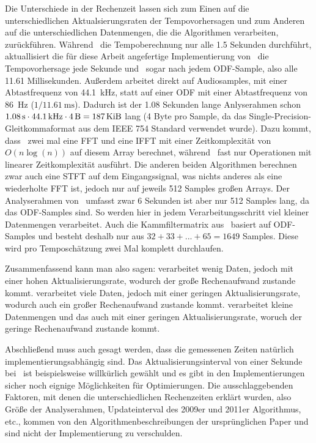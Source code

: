 {{		%
		Die Unterschiede in der Rechenzeit lassen sich zum Einen auf die unterschiedlichen Aktualsierungsraten der Tempovorhersagen
			und zum Anderen auf die unterschiedlichen Datenmengen,
			die die Algorithmen verarbeiten,
			zurückführen.
		Während~\cite{2009_DaPlSt} die Tempoberechnung nur alle \num{1.5} Sekunden durchführt,
			aktuallisiert die für diese Arbeit angefertige Implementierung von~\cite{2001_BeatThis} die Tempovorhersage jede Sekunde
			und~\cite{2011_PlRoSt} sogar nach jedem \ac{ODF}-Sample,
			also alle \num{11.61} Millisekunden.
		Au{\ss}erdem arbeitet \cite{2001_BeatThis} direkt auf Audiosamples,
			mit einer Abtastfrequenz von \SI{44.1}{\kilo\hertz},
			statt auf einer \ac{ODF} mit einer Abtastfrequenz von \SI{86}{\hertz} ($1 / \SI{11.61}{\milli\second}$).
		Dadurch ist der \num{1.08} Sekunden lange Anlyserahmen schon $\SI{1.08}{\second} \cdot \SI{44.1}{\kilo\hertz} \cdot \SI{4}{\byte} = \SI{187}{\kibi\byte}$ lang (\num{4} Byte pro Sample, da das Single-Precision-Gleitkommaformat aus dem \acs{IEEE} 754 Standard verwendet wurde).
		Dazu kommt,
			dass~\cite{2001_BeatThis} zwei mal eine \ac{FFT} und eine \ac{IFFT} mit einer Zeitkomplexität von $O(n\log(n))$ auf diesem Array berechnet,
			während~\cite{2009_DaPlSt} fast nur Operationen mit linearer Zeitkomplexität ausführt.
		Die anderen beiden Algorithmen berechnen zwar auch eine \ac{STFT} auf dem Eingangssignal,
			was nichts anderes als eine wiederholte \ac{FFT} ist,
			jedoch nur auf jeweils \num{512} Samples gro{\ss}en Arrays.
		Der Analyserahmen von~\cite{2009_DaPlSt} umfasst zwar \num{6} Sekunden
			ist aber nur \num{512} Samples lang,
			da das \ac{ODF}-Samples sind.
		So werden hier in jedem Verarbeitungsschritt viel kleiner Datenmengen verarbeitet.
		Auch die Kammfiltermatrix aus~\cite{2011_PlRoSt} basiert auf \ac{ODF}-Samples
			und besteht deshalb nur aus $32 + 33 + ... + 65 = 1649$ Samples.
		Diese wird pro Temposchätzung zwei Mal komplett durchlaufen.

		Zusammenfassend kann man also sagen:
		\cite{2011_PlRoSt} verarbeitet wenig Daten,
			jedoch mit einer hohen Aktualisierungsrate,
			wodurch der gro{\ss}e Rechenaufwand zustande kommt.
		\cite{2001_BeatThis} verarbeitet viele Daten,
			jedoch mit einer geringen Aktualisierungsrate,
			wodurch auch ein gro{\ss}er Rechenaufwand zustande kommt.
		\cite{2009_DaPlSt} verarbeitet kleine Datenmengen
			und das auch mit einer geringen Aktualisierungsrate,
			woruch der geringe Rechenaufwand zustande kommt.

		Abschlie{\ss}end muss auch gesagt werden,
			dass die gemessenen Zeiten natürlich implementierungsabhängig sind.
		Das Aktualisierungsinterval von einer Sekunde bei~\cite{2001_BeatThis} ist beispielsweise willkürlich gewählt
			und es gibt in den Implementierungen sicher noch eignige Möglichkeiten für Optimierungen.
		Die ausschlaggebenden Faktoren,
			mit denen die unterschiedlichen Rechenzeiten erklärt wurden,
			also Grö{\ss}e der Analyserahmen,
			Updateinterval des 2009er und 2011er Algorithmus,
			etc.,
			kommen von den Algorithmenbeschreibungen der ursprünglichen Paper
			und sind nicht der Implementierung zu verschulden.
	}
}
